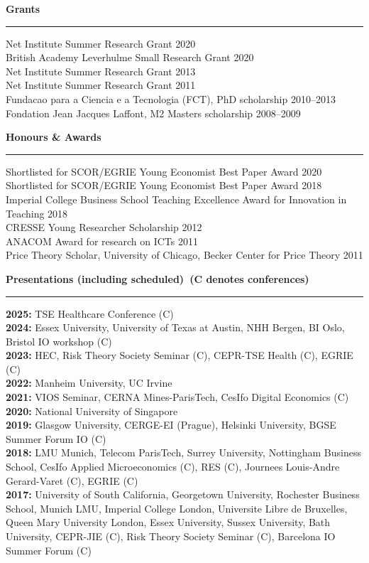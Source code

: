 \documentclass[11pt,a4paper]{article}
\newenvironment{rSection}[1]{%
  \vspace{0.5em}%
  \noindent\textbf{\large #1}%
  \vspace{0.3em}\par
  \hrule
  \vspace{0.5em}
}{%
  \vspace{0.8em}
}
\begin{document}
\begin{rSection}{Grants}
Net Institute Summer Research Grant \hfill 2020 \\
British Academy Leverhulme Small Research Grant \hfill 2020 \\
Net Institute Summer Research Grant \hfill 2013 \\
Net Institute Summer Research Grant \hfill 2011 \\
Fundacao para a Ciencia e a Tecnologia (FCT), PhD scholarship \hfill 2010--2013 \\
Fondation Jean Jacques Laffont, M2 Masters scholarship \hfill 2008--2009
\end{rSection}

\begin{rSection}{Honours \& Awards}
Shortlisted for SCOR/EGRIE Young Economist Best Paper Award \hfill 2020 \\
Shortlisted for SCOR/EGRIE Young Economist Best Paper Award \hfill 2018 \\
Imperial College Business School Teaching Excellence Award for Innovation in Teaching \hfill 2018 \\
CRESSE Young Researcher Scholarship \hfill 2012 \\
ANACOM Award for research on ICTs \hfill 2011 \\
Price Theory Scholar, University of Chicago, Becker Center for Price Theory \hfill 2011
\end{rSection}

\begin{rSection}{Presentations (including scheduled)\ {\small\mdseries (C denotes conferences)}}
\textbf{2025:} TSE Healthcare Conference (C) \\ 
\textbf{2024:} Essex University, University of Texas at Austin, NHH Bergen, BI Oslo, Bristol IO workshop (C) \\ 
\textbf{2023:} HEC, Risk Theory Society Seminar (C), CEPR-TSE Health (C), EGRIE (C) \\ 
\textbf{2022:} Manheim University, UC Irvine \\ 
\textbf{2021:} VIOS Seminar, CERNA Mines-ParisTech, CesIfo Digital Economics (C) \\
\textbf{2020:} National University of Singapore \\ 
\textbf{2019:} Glasgow University, CERGE-EI (Prague), Helsinki University, BGSE Summer Forum IO (C) \\ 
\textbf{2018:} LMU Munich, Telecom ParisTech, Surrey University, Nottingham Business School, CesIfo Applied Microeconomics (C), RES (C), Journees Louis-Andre Gerard-Varet (C), EGRIE (C) \\ 
\textbf{2017:} University of South California, Georgetown University, Rochester Business School, Munich LMU, Imperial College London, Universite Libre de Bruxelles, Queen Mary University London, Essex University, Sussex University, Bath University, CEPR-JIE (C), Risk Theory Society Seminar (C), Barcelona IO Summer Forum (C) 
\end{rSection}
\end{document}
